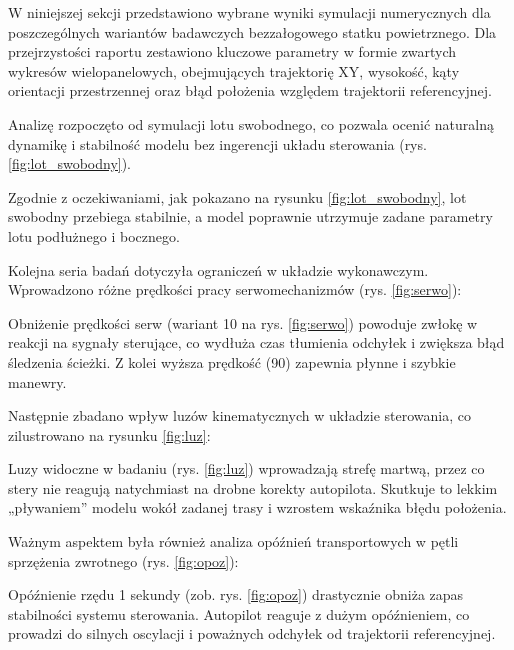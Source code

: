 \akapit W niniejszej sekcji przedstawiono wybrane wyniki symulacji numerycznych dla poszczególnych wariantów badawczych bezzałogowego statku powietrznego. Dla przejrzystości raportu zestawiono kluczowe parametry w formie zwartych wykresów wielopanelowych, obejmujących trajektorię XY, wysokość, kąty orientacji przestrzennej oraz błąd położenia względem trajektorii referencyjnej.

\akapit Analizę rozpoczęto od symulacji lotu swobodnego, co pozwala ocenić naturalną dynamikę i stabilność modelu bez ingerencji układu sterowania (rys. \ref{fig:lot_swobodny}).


\akapit Zgodnie z oczekiwaniami, jak pokazano na rysunku \ref{fig:lot_swobodny}, lot swobodny przebiega stabilnie, a model poprawnie utrzymuje zadane parametry lotu podłużnego i bocznego.

\akapit Kolejna seria badań dotyczyła ograniczeń w układzie wykonawczym. Wprowadzono różne prędkości pracy serwomechanizmów (rys. \ref{fig:serwo}):


\akapit Obniżenie prędkości serw (wariant 10 na rys. \ref{fig:serwo}) powoduje zwłokę w reakcji na sygnały sterujące, co wydłuża czas tłumienia odchyłek i zwiększa błąd śledzenia ścieżki. Z kolei wyższa prędkość (90) zapewnia płynne i szybkie manewry.

\akapit Następnie zbadano wpływ luzów kinematycznych w układzie sterowania, co zilustrowano na rysunku \ref{fig:luz}:


\akapit Luzy widoczne w badaniu (rys. \ref{fig:luz}) wprowadzają strefę martwą, przez co stery nie reagują natychmiast na drobne korekty autopilota. Skutkuje to lekkim „pływaniem” modelu wokół zadanej trasy i wzrostem wskaźnika błędu położenia.

\akapit Ważnym aspektem była również analiza opóźnień transportowych w pętli sprzężenia zwrotnego (rys. \ref{fig:opoz}):


\akapit Opóźnienie rzędu 1 sekundy (zob. rys. \ref{fig:opoz}) drastycznie obniża zapas stabilności systemu sterowania. Autopilot reaguje z dużym opóźnieniem, co prowadzi do silnych oscylacji i poważnych odchyłek od trajektorii referencyjnej.


